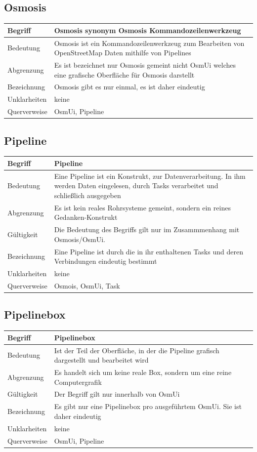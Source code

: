 \documentclass[a4paper,12pt]{scrartcl}
\begin{document}
\begin{center}
\subsection{Osmosis}
\begin{tabular}{|p{5cm}|p{10cm}|}
\hline Begriff & \textbf{Osmosis} synonym Osmosis Kommandozeilenwerkzeug\\ 
\hline Bedeutung & Osmosis ist ein Kommandozeilenwerkzeug zum Bearbeiten von OpenStreetMap Daten mithilfe von Pipelines \\ 
\hline Abgrenzung & Es ist bezeichnet nur Osmosis gemeint nicht OsmUi welches eine grafische Oberfläche für Osmosis darstellt\\  
\hline Bezeichnung & Osmosis gibt es nur einmal, es ist daher eindeutig \\ 
\hline Unklarheiten & keine \\ 
\hline Querverweise & OsmUi, Pipeline \\ 
\hline 
\end{tabular}
\subsection{Pipeline}
\begin{tabular}{|p{5cm}|p{10cm}|}
\hline Begriff & \textbf{Pipeline} \\ 
\hline Bedeutung & Eine Pipeline ist ein Konstrukt, zur Datenverarbeitung. In ihm werden Daten eingelesen, durch Tasks verarbeitet und schließlich ausgegeben\\ 
\hline Abgrenzung & Es ist kein reales Rohrsysteme gemeint, sondern ein reines Gedanken-Konstrukt \\ 
\hline Gültigkeit & Die Bedeutung des Begriffs gilt nur im Zusammmenhang mit Osmosis/OsmUi. \\ 
\hline Bezeichnung & Eine Pipeline ist durch die in ihr enthaltenen Tasks und deren Verbindungen eindeutig bestimmt \\ 
\hline Unklarheiten & keine \\ 
\hline Querverweise & Osmois, OsmUi, Task \\ 
\hline 
\end{tabular}
\subsection{Pipelinebox}
\begin{tabular}{|p{5cm}|p{10cm}|}
\hline Begriff & \textbf{Pipelinebox} \\ 
\hline Bedeutung & Ist der Teil der Oberfläche, in der die Pipeline grafisch dargestellt und bearbeitet wird \\ 
\hline Abgrenzung & Es handelt sich um keine reale Box, sondern um eine reine Computergrafik \\ 
\hline Gültigkeit & Der Begriff gilt nur innerhalb von OsmUi \\ 
\hline Bezeichnung & Es gibt nur eine Pipelinebox pro ausgeführtem OsmUi. Sie ist daher eindeutig \\ 
\hline Unklarheiten & keine \\ 
\hline Querverweise & OsmUi, Pipeline \\ 
\hline 
\end{tabular}

\end{center}
\end{document}
